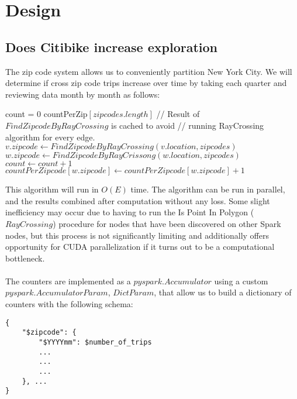 \documentclass{article}
\begin{document}
\section{Design}
\subsection{Does Citibike increase exploration}
The zip code system allows us to conveniently partition New York City. We will determine if cross zip code trips increase over time by taking each quarter and reviewing data month by month as follows:
\begin{algorithmic}[1]
	\State count = 0
	\State countPerZip$[zipcodes.length]$
		\State // Result of $FindZipcodeByRayCrossing$ is cached to avoid
		\State // running RayCrossing algorithm for every edge.
		\State $v.zipcode \gets FindZipcodeByRayCrossing(v.location, zipcodes)$
		\State $w.zipcode \gets FindZipcodeByRayCrissong(w.location, zipcodes)$
			\State $count \gets count + 1$
			\State $countPerZipcode[w.zipcode] \gets countPerZipcode[w.zipcode] + 1$
		\EndIf
	\EndFor
\EndProcedure
\end{algorithmic}

This algorithm will run in $O(E)$ time. The algorithm can be run in parallel, and the results combined after computation without any loss. Some slight inefficiency may occur due to having to run the Is Point In Polygon ($RayCrossing$) procedure for nodes that have been discovered on other Spark nodes, but this process is not significantly limiting and additionally offers opportunity for CUDA parallelization if it turns out to be a computational bottleneck.
\paragraph{}
The counters are implemented as a $pyspark.Accumulator$ using a custom $pyspark.AccumulatorParam$, $DictParam$, that allow us to build a dictionary of counters with the following schema:
\lstset{language=python,
                basicstyle=\ttfamily
}
\begin{lstlisting}
{
	"$zipcode": {
		"$YYYYmm": $number_of_trips
		...
		...
		...
	}, ...
}
\end{lstlisting}
\end{document}
